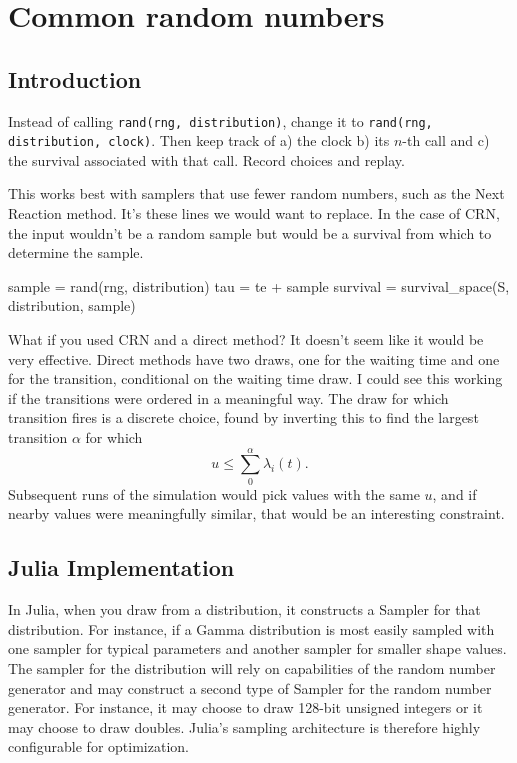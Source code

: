 \documentclass{article}
\begin{document}
\section{Common random numbers}

\subsection{Introduction}

Instead of calling \texttt{rand(rng, distribution)}, change it to \texttt{rand(rng, distribution, clock)}. Then keep track of a) the clock b) its $n$-th call and c) the survival associated with that call. Record choices and replay.

This works best with samplers that use fewer random numbers, such as the Next Reaction method. It's these lines we would want to replace. In the case of CRN, the input wouldn't be a random sample but would be a survival from which to determine the sample.

\begin{jllisting}
sample = rand(rng, distribution)
tau = te + sample
survival = survival_space(S, distribution, sample)
\end{jllisting}

What if you used CRN and a direct method? It doesn't seem like it would be very effective. Direct methods have two draws, one for the waiting time and one for the transition, conditional on the waiting time draw. I could see this working if the transitions were ordered in a meaningful way. The draw for which transition fires is a discrete choice, found by inverting this to find the largest transition $\alpha$ for which
\begin{equation}
	u \le \sum_{0}^{\alpha}\lambda_i(t).
\end{equation}
Subsequent runs of the simulation would pick values with the same $u$, and if nearby values were meaningfully similar, that would be an interesting constraint.

\subsection{Julia Implementation}

In Julia, when you draw from a distribution, it constructs a Sampler for that distribution. For instance, if a Gamma distribution is most easily sampled with one sampler for typical parameters and another sampler for smaller shape values. The sampler for the distribution will rely on capabilities of the random number generator and may construct a second type of Sampler for the random number generator. For instance, it may choose to draw 128-bit unsigned integers or it may choose to draw doubles. Julia's sampling architecture is therefore highly configurable for optimization.
\end{document}
